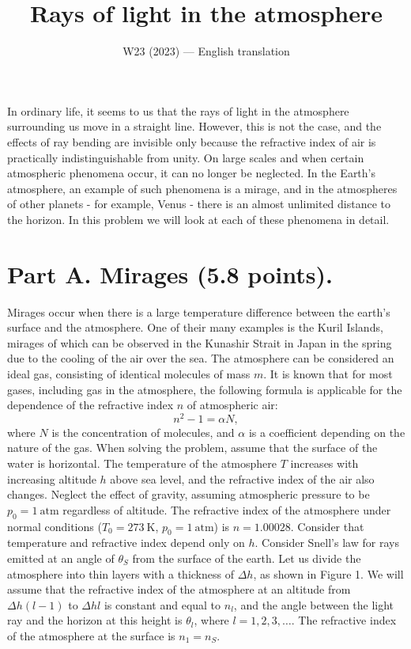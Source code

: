 \documentclass[11pt,a4paper]{article}
\title{\textbf{Rays of light in the atmosphere}}
\author{\normalsize W23 (2023) --- English translation}
\date{}
\begin{document}
\maketitle

In ordinary life, it seems to us that the rays of light in the atmosphere surrounding us move in a straight line. However, this is not the case, and the effects of ray bending are invisible only because the refractive index of air is practically indistinguishable from unity. On large scales and when certain atmospheric phenomena occur, it can no longer be neglected. In the Earth's atmosphere, an example of such phenomena is a mirage, and in the atmospheres of other planets - for example, Venus - there is an almost unlimited distance to the horizon. In this problem we will look at each of these phenomena in detail.

\section*{Part A. Mirages (5.8 points).}

Mirages occur when there is a large temperature difference between the earth's surface and the atmosphere. One of their many examples is the Kuril Islands, mirages of which can be observed in the Kunashir Strait in Japan in the spring due to the cooling of the air over the sea. The atmosphere can be considered an ideal gas, consisting of identical molecules of mass $m$. It is known that for most gases, including gas in the atmosphere, the following formula is applicable for the dependence of the refractive index $n$ of atmospheric air: \[n^2-1=\alpha N,\] where $N$ is the concentration of molecules, and $\alpha$ is a coefficient depending on the nature of the gas. When solving the problem, assume that the surface of the water is horizontal. The temperature of the atmosphere $T$ increases with increasing altitude $h$ above sea level, and the refractive index of the air also changes. Neglect the effect of gravity, assuming atmospheric pressure to be $p_0=1~\text{atm}$ regardless of altitude. The refractive index of the atmosphere under normal conditions ($T_0=273~\text{K}$, $p_0=1~\text{atm}$) is $n=1.00028$. Consider that temperature and refractive index depend only on $h$. Consider Snell's law for rays emitted at an angle of $\theta_S$ from the surface of the earth. Let us divide the atmosphere into thin layers with a thickness of $\Delta h$, as shown in Figure 1. We will assume that the refractive index of the atmosphere at an altitude from $\Delta h(l-1)$ to $\Delta hl$ is constant and equal to $n_l$, and the angle between the light ray and the horizon at this height is $\theta_l$, where $l=1,2,3,\ldots$. The refractive index of the atmosphere at the surface is $n_1=n_S$.
\end{document}
